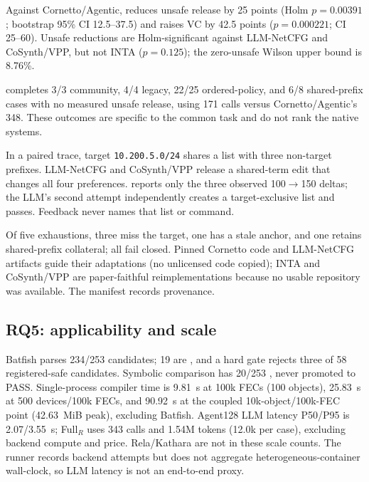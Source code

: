 Against Cornetto/Agentic, \system reduces unsafe release by 25 points
(Holm $p=0.00391$; bootstrap 95\% CI 12.5--37.5) and raises VC by 42.5 points
($p=0.000221$; CI 25--60).  Unsafe reductions are Holm-significant against
LLM-NetCFG and CoSynth/VPP, but not INTA ($p=0.125$); the zero-unsafe Wilson
upper bound is 8.76\%.

\system completes 3/3 community, 4/4 legacy, 22/25 ordered-policy, and 6/8
shared-prefix cases with no measured unsafe release, using 171 calls versus
Cornetto/Agentic's 348.  These outcomes are specific to the common task and do
not rank the native systems.

In a paired trace, target \texttt{10.200.5.0/24} shares a list with three
non-target prefixes.  LLM-NetCFG and CoSynth/VPP release a shared-term edit
that changes all four preferences.  \system reports only the three observed
100$\rightarrow$150 deltas; the LLM's second attempt independently creates a
target-exclusive list and passes.  Feedback never names that list or command.

Of five \system exhaustions, three miss the target, one has a stale anchor, and
one retains shared-prefix collateral; all fail closed.  Pinned
Cornetto code and LLM-NetCFG artifacts guide their adaptations (no unlicensed
code copied); INTA and CoSynth/VPP are paper-faithful reimplementations because
no usable repository was available.  The manifest records provenance.

\subsection{RQ5: applicability and scale}

Batfish parses 234/253 candidates; 19 are \na, and a hard gate rejects three of
58 registered-safe candidates.  Symbolic comparison has 20/253 \na, never
promoted to PASS.  Single-process compiler time is 9.81~s at 100k FECs (100
objects), 25.83~s at 500 devices/100k FECs, and 90.92~s at the coupled
10k-object/100k-FEC point (42.63~MiB peak), excluding Batfish.  Agent128 LLM
latency P50/P95 is 2.07/3.55~s; Full$_R$ uses 343 calls and 1.54M tokens (12.0k
per case), excluding backend compute and price.  Rela/Kathara are not in these
scale counts.  The runner records backend attempts but does not aggregate
heterogeneous-container wall-clock, so LLM latency is not an end-to-end proxy.
